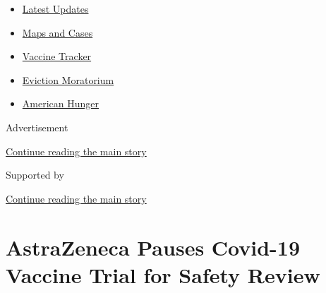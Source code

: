 \begin{itemize}
\tightlist
\item
  \href{https://www.nytimes3xbfgragh.onion/2020/09/08/world/covid-19-coronavirus.html?name=styln-coronavirus-national\&region=TOP_BANNER\&block=storyline_menu_recirc\&action=click\&pgtype=Article\&impression_id=ec74b411-f278-11ea-8a8c-b5a05ac83e51\&variant=undefined}{Latest
  Updates}
\item
  \href{https://www.nytimes3xbfgragh.onion/interactive/2020/us/coronavirus-us-cases.html?name=styln-coronavirus-national\&region=TOP_BANNER\&block=storyline_menu_recirc\&action=click\&pgtype=Article\&impression_id=ec74b412-f278-11ea-8a8c-b5a05ac83e51\&variant=undefined}{Maps
  and Cases}
\item
  \href{https://www.nytimes3xbfgragh.onion/interactive/2020/science/coronavirus-vaccine-tracker.html?name=styln-coronavirus-national\&region=TOP_BANNER\&block=storyline_menu_recirc\&action=click\&pgtype=Article\&impression_id=ec74b413-f278-11ea-8a8c-b5a05ac83e51\&variant=undefined}{Vaccine
  Tracker}
\item
  \href{https://www.nytimes3xbfgragh.onion/2020/09/02/your-money/eviction-moratorium-covid.html?name=styln-coronavirus-national\&region=TOP_BANNER\&block=storyline_menu_recirc\&action=click\&pgtype=Article\&impression_id=ec74b414-f278-11ea-8a8c-b5a05ac83e51\&variant=undefined}{Eviction
  Moratorium}
\item
  \href{https://www.nytimes3xbfgragh.onion/interactive/2020/09/02/magazine/food-insecurity-hunger-us.html?name=styln-coronavirus-national\&region=TOP_BANNER\&block=storyline_menu_recirc\&action=click\&pgtype=Article\&impression_id=ec74b415-f278-11ea-8a8c-b5a05ac83e51\&variant=undefined}{American
  Hunger}
\end{itemize}

Advertisement

\protect\hyperlink{after-top}{Continue reading the main story}

Supported by

\protect\hyperlink{after-sponsor}{Continue reading the main story}

\hypertarget{astrazeneca-pauses-covid-19-vaccine-trial-for-safety-review}{%
\section{AstraZeneca Pauses Covid-19 Vaccine Trial for Safety
Review}\label{astrazeneca-pauses-covid-19-vaccine-trial-for-safety-review}}

